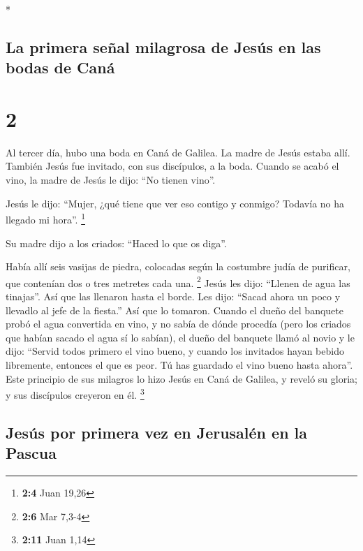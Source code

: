 \begin{paracol}{2}
\switchcolumn[0]*

\hypertarget{la-primera-seuxf1al-milagrosa-de-jesuxfas-en-las-bodas-de-canuxe1}{%
\subsection{La primera señal milagrosa de Jesús en las bodas de
Caná}\label{la-primera-seuxf1al-milagrosa-de-jesuxfas-en-las-bodas-de-canuxe1}}

\hypertarget{section-2}{%
\section{2}\label{section-2}}

 Al tercer día, hubo una boda en Caná de Galilea. La madre
de Jesús estaba allí.  También Jesús fue invitado, con sus
discípulos, a la boda.  Cuando se acabó el vino, la madre
de Jesús le dijo: ``No tienen vino''.

 Jesús le dijo: ``Mujer, ¿qué tiene que ver eso contigo y
conmigo? Todavía no ha llegado mi hora''. \footnote{\textbf{2:4} Juan
  19,26}

 Su madre dijo a los criados: ``Haced lo que os diga''.

 Había allí seis vasijas de piedra, colocadas según la
costumbre judía de purificar, que contenían dos o tres metretes cada
una. \footnote{\textbf{2:6} Mar 7,3-4}  Jesús les dijo:
``Llenen de agua las tinajas''. Así que las llenaron hasta el borde.
 Les dijo: ``Sacad ahora un poco y llevadlo al jefe de la
fiesta.'' Así que lo tomaron.  Cuando el dueño del
banquete probó el agua convertida en vino, y no sabía de dónde procedía
(pero los criados que habían sacado el agua sí lo sabían), el dueño del
banquete llamó al novio  y le dijo: ``Servid todos
primero el vino bueno, y cuando los invitados hayan bebido libremente,
entonces el que es peor. Tú has guardado el vino bueno hasta ahora''.
 Este principio de sus milagros lo hizo Jesús en Caná de
Galilea, y reveló su gloria; y sus discípulos creyeron en él.
\footnote{\textbf{2:11} Juan 1,14}

\hypertarget{jesuxfas-por-primera-vez-en-jerusaluxe9n-en-la-pascua}{%
\subsection{Jesús por primera vez en Jerusalén en la
Pascua}\label{jesuxfas-por-primera-vez-en-jerusaluxe9n-en-la-pascua}}


\end{paracol}
